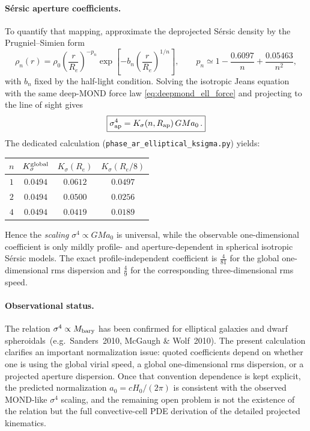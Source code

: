 \documentclass[11pt]{article}
\begin{document}
\paragraph{S\'ersic aperture coefficients.}
To quantify that mapping, approximate the deprojected S\'ersic density by the
Prugniel--Simien form
\begin{equation}
  \rho_n(r)=\rho_0
  \left(\frac{r}{R_e}\right)^{-p_n}
  \exp\!\left[-b_n\left(\frac{r}{R_e}\right)^{1/n}\right],
  \qquad
  p_n \simeq 1-\frac{0.6097}{n}+\frac{0.05463}{n^2},
\label{eq:prugniel_simien}
\end{equation}
with $b_n$ fixed by the half-light condition.  Solving the isotropic Jeans
equation with the same deep-MOND force law \eqref{eq:deepmond_ell_force} and
projecting to the line of sight gives
\begin{equation}
  \boxed{\sigma_{\rm ap}^4
  = K_\sigma(n,R_{\rm ap})\,GMa_0\,.}
\label{eq:faber_jackson}
\end{equation}
The dedicated calculation
(\texttt{phase\_ar\_elliptical\_ksigma.py}) yields:
\begin{center}
\begin{tabular}{cccc}
\toprule
$n$ & $K_\sigma^{\rm global}$ & $K_\sigma(R_e)$ & $K_\sigma(R_e/8)$ \\
\midrule
$1$ & $0.0494$ & $0.0612$ & $0.0497$ \\
$2$ & $0.0494$ & $0.0500$ & $0.0256$ \\
$4$ & $0.0494$ & $0.0419$ & $0.0189$ \\
\bottomrule
\end{tabular}
\end{center}
Hence the \emph{scaling} $\sigma^4\propto GMa_0$ is universal, while the
observable one-dimensional coefficient is only mildly profile- and
aperture-dependent in spherical isotropic S\'ersic models.  The exact
profile-independent coefficient is $\tfrac{4}{81}$ for the global
one-dimensional rms dispersion and $\tfrac{4}{9}$ for the corresponding
three-dimensional rms speed.

\paragraph{Observational status.}
The relation $\sigma^4 \propto M_{\rm bary}$ has been confirmed for
elliptical galaxies and dwarf spheroidals~(e.g.\ Sanders~2010,
McGaugh \& Wolf~2010).  The present calculation clarifies an important
normalization issue: quoted coefficients depend on whether one is using the
global virial speed, a global one-dimensional rms dispersion, or a projected
aperture dispersion.  Once that convention dependence is kept explicit, the
predicted normalization $a_0=cH_0/(2\pi)$ is consistent with the observed
MOND-like $\sigma^4$ scaling, and the remaining open problem is not the
existence of the relation but the full convective-cell PDE derivation of the
detailed projected kinematics.
\end{document}
